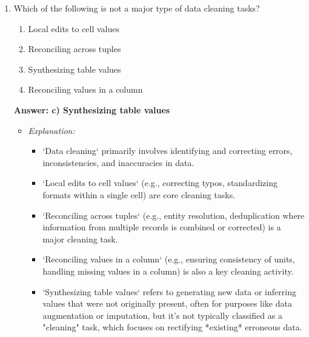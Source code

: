 \documentclass{article}
\begin{document}
\begin{enumerate}[label=\textbf{Question \arabic*.}]
    \item Which of the following is not a major type of data cleaning tasks?
        \begin{enumerate}[label=\alph*)]
            \item Local edits to cell values
            \item Reconciling across tuples
            \item Synthesizing table values
            \item Reconciling values in a column
        \end{enumerate}
        \textbf{Answer: c) Synthesizing table values}
        \begin{itemize}
            \item \textit{Explanation:}
            \begin{itemize}
                \item `Data cleaning` primarily involves identifying and correcting errors, inconsistencies, and inaccuracies in data.
                \item `Local edits to cell values` (e.g., correcting typos, standardizing formats within a single cell) are core cleaning tasks.
                \item `Reconciling across tuples` (e.g., entity resolution, deduplication where information from multiple records is combined or corrected) is a major cleaning task.
                \item `Reconciling values in a column` (e.g., ensuring consistency of units, handling missing values in a column) is also a key cleaning activity.
                \item `Synthesizing table values` refers to generating new data or inferring values that were not originally present, often for purposes like data augmentation or imputation, but it's not typically classified as a "cleaning" task, which focuses on rectifying *existing* erroneous data.
            \end{itemize}
        \end{itemize}
    

\end{enumerate}
\end{document}
